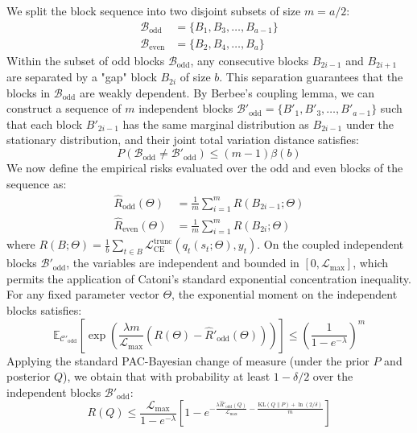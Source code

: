 We split the block sequence into two disjoint subsets of size $m = a / 2$:
\begin{align}
    \mathcal{B}_{\text{odd}} &= \{B_1, B_3, \dots, B_{a-1}\} \\
    \mathcal{B}_{\text{even}} &= \{B_2, B_4, \dots, B_a\}
\end{align}
Within the subset of odd blocks $\mathcal{B}_{\text{odd}}$, any consecutive blocks $B_{2i-1}$ and $B_{2i+1}$ are separated by a "gap" block $B_{2i}$ of size $b$. This separation guarantees that the blocks in $\mathcal{B}_{\text{odd}}$ are weakly dependent. By Berbee's coupling lemma, we can construct a sequence of $m$ independent blocks $\mathcal{B}'_{\text{odd}} = \{B'_1, B'_3, \dots, B'_{a-1}\}$ such that each block $B'_{2i-1}$ has the same marginal distribution as $B_{2i-1}$ under the stationary distribution, and their joint total variation distance satisfies:
\begin{equation}
    P\left(\mathcal{B}_{\text{odd}} \neq \mathcal{B}'_{\text{odd}}\right) \le (m - 1) \beta(b)
\end{equation}
We now define the empirical risks evaluated over the odd and even blocks of the sequence as:
\begin{align}
    \hat{R}_{\text{odd}}(\Theta) &= \frac{1}{m} \sum_{i=1}^{m} R(B_{2i-1}; \Theta) \\
    \hat{R}_{\text{even}}(\Theta) &= \frac{1}{m} \sum_{i=1}^{m} R(B_{2i}; \Theta)
\end{align}
where $R(B; \Theta) = \frac{1}{b} \sum_{t \in B} \mathcal{L}_{\text{CE}}^{\text{trunc}}(q_t(s_t; \Theta), y_t)$. On the coupled independent blocks $\mathcal{B}'_{\text{odd}}$, the variables are independent and bounded in $[0, \mathcal{L}_{\max}]$, which permits the application of Catoni's standard exponential concentration inequality. For any fixed parameter vector $\Theta$, the exponential moment on the independent blocks satisfies:
\begin{equation}
    \mathbb{E}_{\mathcal{C}'_{\text{odd}}} \left[ \exp\left( \frac{\lambda m}{\mathcal{L}_{\max}} \left( R(\Theta) - \hat{R}'_{\text{odd}}(\Theta) \right) \right) \right] \le \left( \frac{1}{1 - e^{-\lambda}} \right)^{m}
\end{equation}
Applying the standard PAC-Bayesian change of measure (under the prior $P$ and posterior $Q$), we obtain that with probability at least $1 - \delta/2$ over the independent blocks $\mathcal{B}'_{\text{odd}}$:
\begin{equation}
    R(Q) \le \frac{\mathcal{L}_{\max}}{1 - e^{-\lambda}} \left[ 1 - e^{-\frac{\lambda \hat{R}'_{\text{odd}}(Q)}{\mathcal{L}_{\max}} - \frac{\text{KL}(Q \| P) + \ln(2/\delta)}{m}} \right]
\end{equation}
